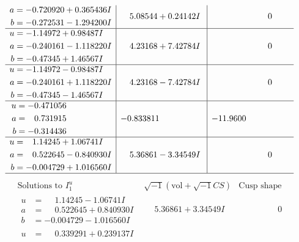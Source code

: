 \documentclass[1p]{elsarticle_modified}
\theoremstyle{definition}
\newcommand{\I}{\sqrt{-1}}
\begin{document}
$$\begin{array}{c|c|c}
\begin{aligned}
a &= -0.720920 + 0.365436 I \\
b &= -0.272531 - 1.294200 I\end{aligned}
 & \phantom{-}5.08544 + 0.24142 I & \phantom{-0.000000 } 0 \\ \hline\begin{aligned}
u &= -1.14972 + 0.98487 I \\
a &= -0.240161 - 1.118220 I \\
b &= -0.47345 + 1.46567 I\end{aligned}
 & \phantom{-}4.23168 + 7.42784 I & \phantom{-0.000000 } 0 \\ \hline\begin{aligned}
u &= -1.14972 - 0.98487 I \\
a &= -0.240161 + 1.118220 I \\
b &= -0.47345 - 1.46567 I\end{aligned}
 & \phantom{-}4.23168 - 7.42784 I & \phantom{-0.000000 } 0 \\ \hline\begin{aligned}
u &= -0.471056\phantom{ +0.000000I} \\
a &= \phantom{-}0.731915\phantom{ +0.000000I} \\
b &= -0.314436\phantom{ +0.000000I}\end{aligned}
 & -0.833811\phantom{ +0.000000I} & -11.9600\phantom{ +0.000000I} \\ \hline\begin{aligned}
u &= \phantom{-}1.14245 + 1.06741 I \\
a &= \phantom{-}0.522645 - 0.840930 I \\
b &= -0.004729 + 1.016560 I\end{aligned}
 & \phantom{-}5.36861 - 3.34549 I & \phantom{-0.000000 } 0\\
 \hline 
 \end{array}$$\newpage$$\begin{array}{c|c|c}  
\text{Solutions to }I^u_{1}& \I (\text{vol} + \sqrt{-1}CS) & \text{Cusp shape}\\
 \hline 
\begin{aligned}
u &= \phantom{-}1.14245 - 1.06741 I \\
a &= \phantom{-}0.522645 + 0.840930 I \\
b &= -0.004729 - 1.016560 I\end{aligned}
 & \phantom{-}5.36861 + 3.34549 I & \phantom{-0.000000 } 0 \\ \hline\begin{aligned}
u &= \phantom{-}0.339291 + 0.239137 I \\

\end{aligned}
\end{array}$$
\end{document}
